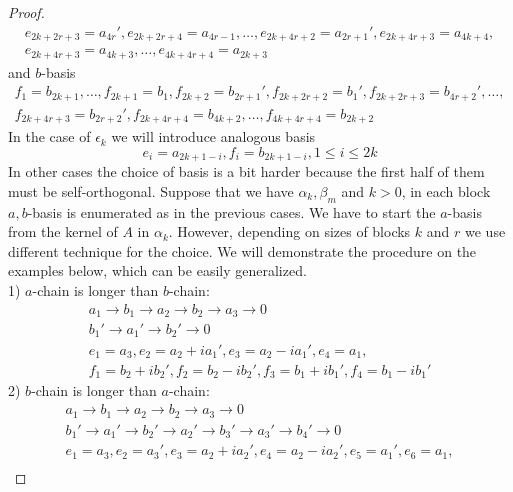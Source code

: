 \documentclass[12pt]{amsart}
\theoremstyle{definition}
\theoremstyle{remark}
\numberwithin{equation}{subsection}
\begin{document}
\begin{proof}
\begin{equation}
\end{equation}
\begin{multline}
    e_{2k+2r+3} = a_{4r}',e_{2k+2r+4}=a_{4r-1},\dots,e_{2k+4r+2}=a_{2r+1}', e_{2k+4r+3}= a_{4k+4},\\
    e_{2k+4r+3}= a_{4k+3},\dots,e_{4k+4r+4}= a_{2k+3}
\end{multline}
and $b$-basis
\begin{multline}
    f_{1}=b_{2k+1},\dots,f_{2k+1}=b_{1},f_{2k+2}=b_{2r+1}',f_{2k+2r+2}=b_{1}',f_{2k+2r+3}=b_{4r+2}',\dots,\\
    f_{2k+4r+3}=b_{2r+2}',f_{2k+4r+4}=b_{4k+2},\dots,f_{4k+4r+4}=b_{2k+2}
\end{multline}
In the case of $\epsilon_k$ we will introduce analogous basis
\begin{equation}
    e_{i}=a_{2k+1-i},f_{i}=b_{2k+1-i}, 1\le i\le 2k
\end{equation}
In other cases the choice of basis is a bit harder because the first half of them must be self-orthogonal. Suppose that we have $\alpha_k,\beta_m$ and $k>0$, in each block $a,b$-basis is enumerated as in the previous cases. We have to start the $a$-basis from the kernel of $A$ in $\alpha_{k}$. However, depending on sizes of blocks $k$ and $r$ we use different technique for the choice. We will demonstrate the procedure on the examples below, which can be easily generalized.\\
1) $a$-chain is longer than $b$-chain:
\begin{equation}
\begin{gathered}
    a_1 \rightarrow b_1 \rightarrow a_2 \rightarrow b_2 \rightarrow a_3 \rightarrow 0\\
    b_1' \rightarrow a_1' \rightarrow b_2' \rightarrow 0\\
    e_{1}=a_3,e_{2}=a_2+ia_1',e_{3}=a_2-ia_1',e_{4}=a_1,\\
    f_{1}=b_2+ib_2',f_{2}=b_2-ib_2',f_{3}=b_1+ib_1',f_{4}=b_1-ib_1'
\end{gathered}
\end{equation}
2) $b$-chain is longer than $a$-chain:
\begin{equation}
\begin{gathered}
    a_1 \rightarrow b_1 \rightarrow a_2 \rightarrow b_2 \rightarrow a_3 \rightarrow 0\\
    b_1' \rightarrow a_1' \rightarrow b_2' \rightarrow a_2' \rightarrow b_3' \rightarrow a_3' \rightarrow b_4' \rightarrow 0\\
    e_{1}=a_3,e_{2}=a_3',e_{3}=a_2+ia_2',e_{4}=a_2-ia_2',e_{5}=a_1',e_{6}=a_1,\\

\end{gathered}
\end{equation}
\end{proof}
\end{document}
